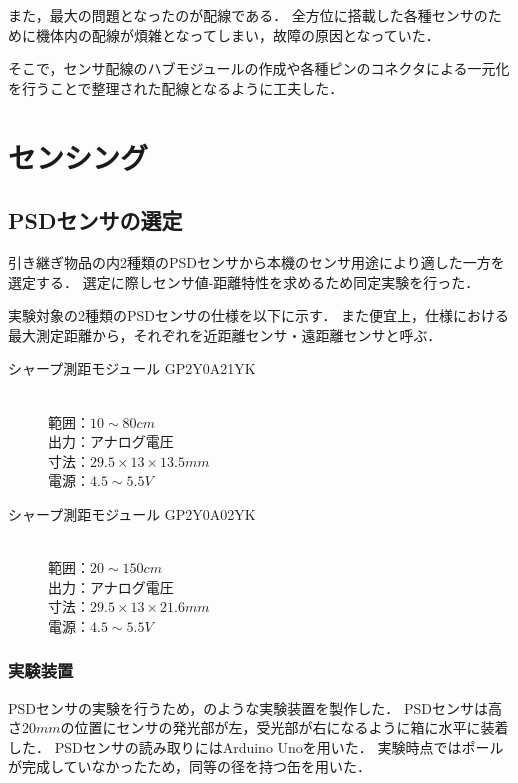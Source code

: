 \documentclass[11pt,a4]{jsarticle}
\begin{document}
    また，最大の問題となったのが配線である．
    全方位に搭載した各種センサのために機体内の配線が煩雑となってしまい，故障の原因となっていた．

    そこで，センサ配線のハブモジュールの作成や各種ピンのコネクタによる一元化を行うことで整理された配線となるように工夫した．

\section{センシング}  %

  \subsection{PSDセンサの選定}  %
    引き継ぎ物品の内2種類のPSDセンサから本機のセンサ用途により適した一方を選定する．
    選定に際しセンサ値-距離特性を求めるため同定実験を行った．

    実験対象の2種類のPSDセンサの仕様を以下に示す．
    また便宜上，仕様における最大測定距離から，それぞれを近距離センサ・遠距離センサと呼ぶ．

    \begin{description}
      \item[シャープ測距モジュール GP2Y0A21YK] \mbox{} \\
        範囲：$10 \sim 80\unit{cm}$ \\
        出力：アナログ電圧 \\
        寸法：$29.5 \times 13 \times 13.5\unit{mm}$ \\
        電源：$4.5 \sim 5.5\unit{V}$
    \end{description}

    \begin{description}
      \item[シャープ測距モジュール GP2Y0A02YK] \mbox{} \\
        範囲：$20 \sim 150\unit{cm}$ \\
        出力：アナログ電圧 \\
        寸法：$29.5 \times 13 \times 21.6\unit{mm}$ \\
        電源：$4.5 \sim 5.5\unit{V}$
    \end{description}

    \subsubsection{実験装置}
      PSDセンサの実験を行うため，のような実験装置を製作した．
      PSDセンサは高さ$20\unit{mm}$の位置にセンサの発光部が左，受光部が右になるように箱に水平に装着した．
      PSDセンサの読み取りにはArduino Unoを用いた．
      実験時点ではポールが完成していなかったため，同等の径を持つ缶を用いた．
\end{document}
